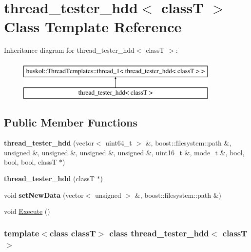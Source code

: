 \hypertarget{classthread__tester__hdd}{
\section{thread\_\-tester\_\-hdd$<$ classT $>$ Class Template Reference}
\label{classthread__tester__hdd}
}
Inheritance diagram for thread\_\-tester\_\-hdd$<$ classT $>$:\begin{figure}[H]
\begin{center}
\leavevmode
\includegraphics[height=2cm]{classthread__tester__hdd}
\end{center}
\end{figure}
\subsection*{Public Member Functions}
\begin{DoxyCompactItemize}
\item 
\hypertarget{classthread__tester__hdd_a1d16c00071aa17b3c1451392719ab204}{
{\bfseries thread\_\-tester\_\-hdd} (vector$<$ uint64\_\-t $>$ \&, boost::filesystem::path \&, unsigned \&, unsigned \&, unsigned \&, unsigned \&, uint16\_\-t \&, mode\_\-t \&, bool, bool, bool, classT $\ast$)}
\label{classthread__tester__hdd_a1d16c00071aa17b3c1451392719ab204}

\item 
\hypertarget{classthread__tester__hdd_a276dec24bd450a5c6322bd60bf99fda1}{
{\bfseries thread\_\-tester\_\-hdd} (classT $\ast$)}
\label{classthread__tester__hdd_a276dec24bd450a5c6322bd60bf99fda1}

\item 
\hypertarget{classthread__tester__hdd_a5b972aaaec16e71925772d6c8eba6fa5}{
void {\bfseries setNewData} (vector$<$ unsigned $>$ \&, boost::filesystem::path \&)}
\label{classthread__tester__hdd_a5b972aaaec16e71925772d6c8eba6fa5}

\item 
void \hyperlink{classthread__tester__hdd_aad16d6b6f1be66d5e851fa2b0408cf06}{Execute} ()
\end{DoxyCompactItemize}
\subsubsection*{template$<$class classT$>$ class thread\_\-tester\_\-hdd$<$ classT $>$}



